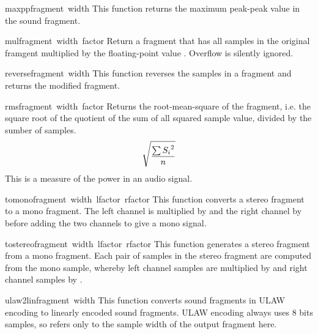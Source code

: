 \begin{funcdesc}{maxpp}{fragment\, width}
This function returns the maximum peak-peak value in the sound fragment.
\end{funcdesc}

\begin{funcdesc}{mul}{fragment\, width\, factor}
Return a fragment that has all samples in the original framgent
multiplied by the floating-point value . Overflow is
silently ignored.
\end{funcdesc}

\begin{funcdesc}{reverse}{fragment\, width}
This function reverses the samples in a fragment and returns the
modified fragment.
\end{funcdesc}

\begin{funcdesc}{rms}{fragment\, width\, factor}
Returns the root-mean-square of the fragment, i.e.
\iftexi
the square root of the quotient of the sum of all squared sample value,
divided by the sumber of samples.
\else
\begin{displaymath}
\catcode`_=8
\sqrt{\frac{\sum{{S_{i}}^{2}}}{n}}
\end{displaymath}
\fi
This is a measure of the power in an audio signal.
\end{funcdesc}

\begin{funcdesc}{tomono}{fragment\, width\, lfactor\, rfactor} 
This function converts a stereo fragment to a mono fragment. The left
channel is multiplied by  and the right channel by
 before adding the two channels to give a mono signal.
\end{funcdesc}

\begin{funcdesc}{tostereo}{fragment\, width\, lfactor\, rfactor}
This function generates a stereo fragment from a mono fragment. Each
pair of samples in the stereo fragment are computed from the mono
sample, whereby left channel samples are multiplied by 
and right channel samples by .
\end{funcdesc}

\begin{funcdesc}{ulaw2lin}{fragment\, width}
This function converts sound fragments in ULAW encoding to linearly
encoded sound fragments. ULAW encoding always uses 8 bits samples, so
 refers only to the sample width of the output fragment here.
\end{funcdesc}

